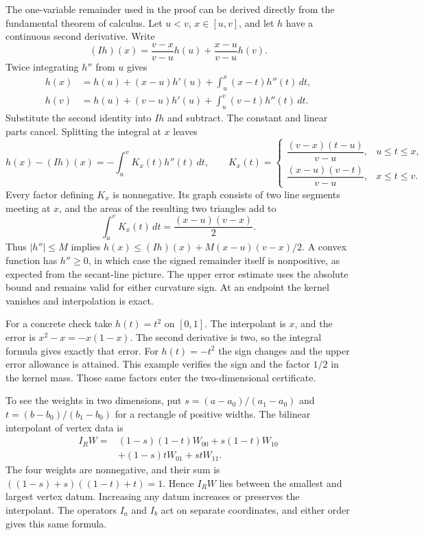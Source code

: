 The one-variable remainder used in the proof can be derived directly
from the fundamental theorem of calculus. Let $u<v$, $x\in[u,v]$,
and let $h$ have a continuous second derivative. Write
\[
 (Ih)(x)=\frac{v-x}{v-u}h(u)+\frac{x-u}{v-u}h(v).
\]
Twice integrating $h''$ from $u$ gives
\[
 \begin{aligned}
 h(x)&=h(u)+(x-u)h'(u)+\int_u^x(x-t)h''(t)\,dt,\\
 h(v)&=h(u)+(v-u)h'(u)+\int_u^v(v-t)h''(t)\,dt.
 \end{aligned}
\]
Substitute the second identity into $Ih$ and subtract. The constant and
linear parts cancel. Splitting the integral at $x$ leaves
\[
 h(x)-(Ih)(x)=-\int_u^v K_x(t)h''(t)\,dt,
 \qquad
 K_x(t)=
 \begin{cases}
 \dfrac{(v-x)(t-u)}{v-u},&u\leq t\leq x,\\[4pt]
 \dfrac{(x-u)(v-t)}{v-u},&x\leq t\leq v.
 \end{cases}
\]
Every factor defining $K_x$ is nonnegative. Its graph consists of two
line segments meeting at $x$, and the areas of the resulting two
triangles add to
\[
 \int_u^vK_x(t)\,dt=\frac{(x-u)(v-x)}2.
\]
Thus $|h''|\leq M$ implies
$h(x)\leq(Ih)(x)+M(x-u)(v-x)/2$. A convex function has
$h''\geq0$, in which case the signed remainder itself is nonpositive,
as expected from the secant-line picture. The upper error estimate
uses the absolute bound and remains valid for either curvature sign.
At an endpoint the kernel vanishes and interpolation is exact.

For a concrete check take $h(t)=t^2$ on $[0,1]$. The interpolant is
$x$, and the error is $x^2-x=-x(1-x)$. The second derivative is two,
so the integral formula gives exactly that error. For $h(t)=-t^2$
the sign changes and the upper error allowance is attained. This
example verifies the sign and the factor $1/2$ in the kernel mass.
Those same factors enter the two-dimensional certificate.

To see the weights in two dimensions, put
$s=(a-a_0)/(a_1-a_0)$ and $t=(b-b_0)/(b_1-b_0)$ for a rectangle
of positive widths. The bilinear interpolant of vertex data is
\[
 \begin{aligned}
 I_RW={}&(1-s)(1-t)W_{00}+s(1-t)W_{10}\\
        &+(1-s)tW_{01}+stW_{11}.
 \end{aligned}
\]
The four weights are nonnegative, and their sum is
$((1-s)+s)((1-t)+t)=1$. Hence $I_RW$ lies between the smallest
and largest vertex datum. Increasing any datum increases or preserves
the interpolant. The operators $I_a$ and $I_b$ act on separate
coordinates, and either order gives this same formula.

